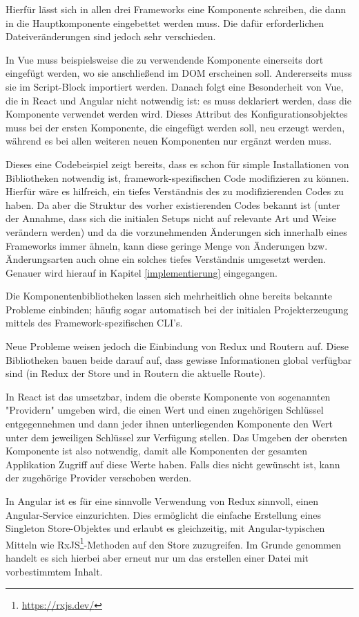 Hierfür lässt sich in allen drei Frameworks eine Komponente schreiben, die dann in die Hauptkomponente eingebettet werden muss. Die dafür erforderlichen Dateiveränderungen sind jedoch sehr verschieden.

In Vue muss beispielsweise die zu verwendende Komponente einerseits dort eingefügt werden, wo sie anschließend im \gls{DOM} erscheinen soll. Andererseits muss sie im Script-Block importiert werden. Danach folgt eine Besonderheit von Vue, die in React und Angular nicht notwendig ist: es muss deklariert werden, dass die Komponente verwendet werden wird. Dieses Attribut des Konfigurationsobjektes muss bei der ersten Komponente, die eingefügt werden soll, neu erzeugt werden, während es bei allen weiteren neuen Komponenten nur ergänzt werden muss.

Dieses eine Codebeispiel zeigt bereits, dass es schon für simple Installationen von Bibliotheken notwendig ist, framework-spezifischen Code modifizieren zu können. Hierfür wäre es hilfreich, ein tiefes Verständnis des zu modifizierenden Codes zu haben. Da aber die Struktur des vorher existierenden Codes bekannt ist (unter der Annahme, dass sich die initialen Setups nicht auf relevante Art und Weise verändern werden) und da die vorzunehmenden Änderungen sich innerhalb eines Frameworks immer ähneln, kann diese geringe Menge von Änderungen bzw. Änderungsarten auch ohne ein solches tiefes Verständnis umgesetzt werden. Genauer wird hierauf in Kapitel \ref{implementierung} eingegangen.

Die Komponentenbibliotheken lassen sich mehrheitlich ohne bereits bekannte Probleme einbinden; häufig sogar automatisch bei der initialen Projekterzeugung mittels des Framework-spezifischen \gls{CLI}'s.

Neue Probleme weisen jedoch die Einbindung von Redux und Routern auf. Diese Bibliotheken bauen beide darauf auf, dass gewisse Informationen global verfügbar sind (in Redux der Store und in Routern die aktuelle Route).

In React ist das umsetzbar, indem die oberste Komponente von sogenannten "Providern" umgeben wird, die einen Wert und einen zugehörigen Schlüssel entgegennehmen und dann jeder ihnen unterliegenden Komponente den Wert unter dem jeweiligen Schlüssel zur Verfügung stellen. Das Umgeben der obersten Komponente ist also notwendig, damit alle Komponenten der gesamten Applikation Zugriff auf diese Werte haben. Falls dies nicht gewünscht ist, kann der zugehörige Provider verschoben werden.

In Angular ist es für eine sinnvolle Verwendung von Redux sinnvoll, einen Angular-Service einzurichten. Dies ermöglicht die einfache Erstellung eines Singleton \missingQuote Store-Objektes und erlaubt es gleichzeitig, mit Angular-typischen Mitteln wie RxJS\footnote{\url{https://rxjs.dev/}}-Methoden auf den Store zuzugreifen. Im Grunde genommen handelt es sich hierbei aber erneut nur um das erstellen einer Datei mit vorbestimmtem Inhalt.

